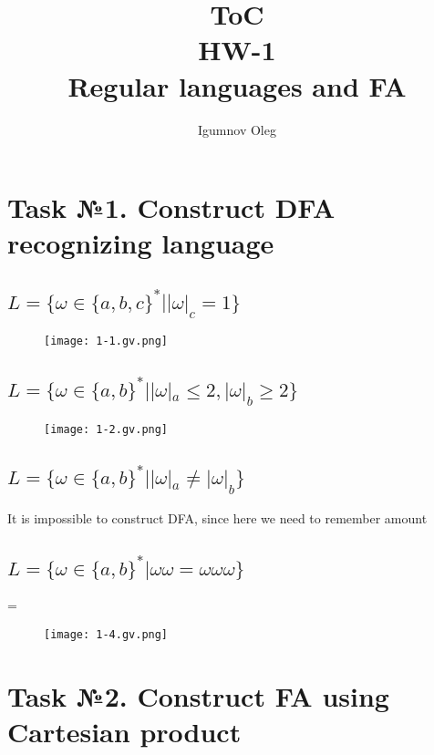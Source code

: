\documentclass{article}
\title{ToC\\
HW-1\\
Regular languages and FA}
\author{Igumnov Oleg}
\begin{document}
\maketitle



\section{Task №1. Construct DFA recognizing language }

\subsection{$L=\{\omega \in \{a,b,c\}^* | |\omega|_{c}=1 \}$}

\begin{figure}[h]
\centering
\texttt{[image: 1-1.gv.png]}
\end{figure}


\subsection{$L=\{\omega \in \{a,b\}^* | |\omega|_{a}\leq 2,|\omega|_{b}\geq 2  \}$}
\begin{figure}[h]
\centering
\texttt{[image: 1-2.gv.png]}
\end{figure}

\subsection{$L=\{\omega \in \{a,b\}^* | |\omega|_{a}\neq |\omega|_{b}  \}$}
It is impossible to construct DFA, since here we need to remember amount
\subsection{$L=\{\omega \in \{a,b\}^* | \omega\omega = \omega\omega\omega  \}$}
\omega = \lambda

\begin{figure}[h]
\centering
\texttt{[image: 1-4.gv.png]}
\end{figure}


\section{Task №2. Construct FA using Cartesian product}
\end{document}
